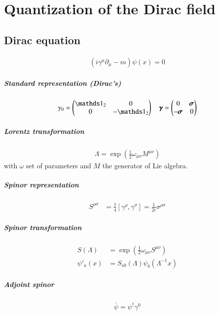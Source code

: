 \chapter{Quantization of the Dirac field}
\setcounter{chapter}{3}
\section{Dirac equation}
\begin{align}
	\left(i \gamma^\mu \partial_\mu - m \right) \psi(x) = 0
\end{align}
\paragraph{Standard representation (Dirac's)}
\begin{align}
	\gamma_0 = \begin{pmatrix} \id_2 & 0 \\ 0 & -\id_2 \end{pmatrix}
	\quad
	\pmb{\gamma} = \begin{pmatrix} 0 & \pmb{\sigma} \\ -\pmb{\sigma} & 0 \end{pmatrix}
\end{align}
\paragraph{Lorentz transformation}
\begin{align}
	\Lambda = \exp(\frac{1}{2}\omega_{\mu\nu}M^{\mu\nu})
\end{align}
with $\omega$ set of parameters and $M$ the generator of Lie algebra.
\paragraph{Spinor representation}
\begin{align}
	S^{\rho\sigma} &= \frac{1}{4} \left[ \gamma^\rho, \gamma^\sigma \right] = \frac{1}{2i}\sigma^{\rho\sigma}
\end{align}
\paragraph{Spinor transformation}
\begin{align}
	S(\Lambda) &= \exp(\frac{1}{2} \omega_{\mu\nu}S^{\mu\nu}) \\
	\psi'_a(x) &= S_{ab}(\Lambda) \psi_b(\Lambda^{-1}x)
\end{align}
\paragraph{Adjoint spinor}
\begin{align}
	\bar{\psi} = \psi^\dagger \gamma^0
\end{align}
